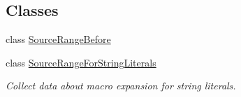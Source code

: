 \subsection*{Classes}
\begin{DoxyCompactItemize}
\item 
class \hyperlink{classclang_1_1tidy_1_1pagesjaunes_1_1_exec_s_q_l_open_to_function_call_1_1_source_range_before}{Source\+Range\+Before}
\item 
class \hyperlink{classclang_1_1tidy_1_1pagesjaunes_1_1_exec_s_q_l_open_to_function_call_1_1_source_range_for_string_literals}{Source\+Range\+For\+String\+Literals}
\begin{DoxyCompactList}\small\item\em Collect data about macro expansion for string literals. \end{DoxyCompactList}\end{DoxyCompactItemize}

